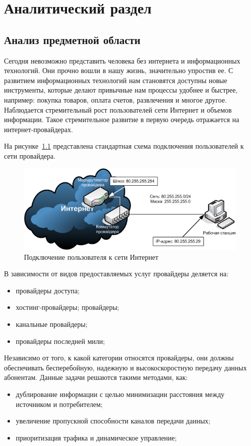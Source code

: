 \chapter{Аналитический раздел}
\label{cha:analysis}
\section{Анализ предметной области}
Сегодня невозможно представить человека без интернета и информационных технологий. Они прочно вошли в нашу жизнь, значительно упростив ее. С развитием информационных технологий нам становятся доступны новые инструменты, которые делают привычные нам процессы удобнее и быстрее, например: покупка товаров, оплата счетов, развлечения и многое другое. Наблюдается стремительный рост пользователей сети Интернет и объемов информации. Такое стремительное развитие в первую очередь отражается на интернет-провайдерах.

На рисунке~\ref{pic:user_connection_schema} представлена стандартная схема подключения пользователей к сети провайдера.
\begin{figure}
\centering
\includegraphics[scale=0.7]{pictures/user_connection_schema}
\caption{Подключение пользователя к сети Интернет}
\label{pic:user_connection_schema}
\end{figure}

В зависимости от видов предоставляемых услуг провайдеры деляется на:
\begin{itemize}
\item провайдеры доступа;
\item хостинг-провайдеры;
 провайдеры;
\item канальные провайдеры;
\item провайдеры последней мили;
\end{itemize}

Независимо от того, к какой категории относятся провайдеры, они должны обеспечивать бесперебойную, надежную и высокоскоростную передачу данных абонентам. Данные задачи решаются такими методами, как:
\begin{itemize}
\item дублирование информации с целью минимизации расстояния между источником и потребителем;
\item увеличение пропускной способности каналов передачи данных;
\item приоритизация трафика и динамическое управление;
\end{itemize}

